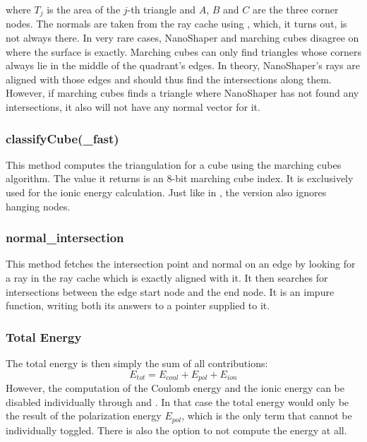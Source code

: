 where $T_j$ is the area of the $j$-th triangle and $A$, $B$ and $C$ are the three corner nodes.
The normals are taken from the ray cache using , which, it turns out, is not always there.
In very rare cases, NanoShaper and marching cubes disagree on where the surface is exactly.
Marching cubes can only find triangles whose corners always lie in the middle of the quadrant's edges.
In theory, NanoShaper's rays are aligned with those edges and should thus find the intersections along them.
However, if marching cubes finds a triangle where NanoShaper has not found any intersections, it also will not have any normal vector for it.

\subsubsection{classifyCube(\_fast)}

This method computes the triangulation for a cube using the marching cubes algorithm.
The value it returns is an 8-bit marching cube index.
It is exclusively used for the ionic energy calculation.
Just like in , the  version also ignores hanging nodes.

\subsubsection{normal\_intersection}

This method fetches the intersection point and normal on an edge by looking for a ray in the ray cache which is exactly aligned with it.
It then searches for intersections between the edge start node and the end node.
It is an impure function, writing both its answers to a pointer supplied to it.

\subsubsection{Total Energy}

The total energy is then simply the sum of all contributions:
\begin{equation}
    E_{tot} = E_{coul} + E_{pol} + E_{ion}
    \label{eq:total-energy}
\end{equation}
However, the computation of the Coulomb energy and the ionic energy can be disabled individually through  and .
In that case the total energy would only be the result of the polarization energy $E_{pol}$, which is the only term that cannot be individually toggled.
There is also the option to not compute the energy at all.